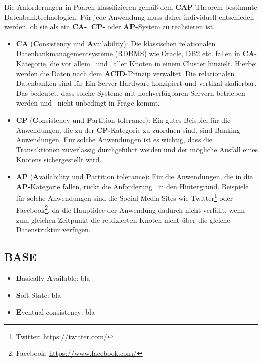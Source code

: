 Die Anforderungen in Paaren klassifizieren gemäß dem \textbf{CAP}-Theorem bestimmte Datenbanktechnologien. Für jede Anwendung muss daher individuell entschieden werden, ob sie als ein \textbf{CA-}, \textbf{CP-} oder \textbf{AP-}System zu realisieren ist.
\begin{itemize}
\item \textbf{CA} (\textbf{C}onsistency und \textbf{A}vailability): Die klassischen relationalen Datenbankmanagementsysteme (RDBMS) wie Oracle, DB2 etc. fallen in \textbf{CA}-Kategorie, die vor allem \Cap\ und \cAp\ aller Knoten in einem Cluster hinzielt. Hierbei werden die Daten nach dem \textbf{ACID}-Prinzip verwaltet. Die relationalen Datenbanken sind für Ein-Server-Hardware konzipiert und vertikal skalierbar. Das bedeutet, dass solche Systeme mit hochverfügbaren Servern betrieben werden und \caP\  nicht unbedingt in Frage kommt.

\item \textbf{CP} (\textbf{C}onsistency und \textbf{P}artition tolerance): Ein gutes Beispiel für die Anwendungen, die zu der \textbf{CP-}Kategorie zu zuordnen sind, sind Banking-Anwendungen. Für solche Anwendungen ist es wichtig, dass die Transaktionen zuverlässig durchgeführt werden und der mögliche Ausfall eines Knotens sichergestellt wird.

\item \textbf{AP} (\textbf{A}vailability und \textbf{P}artition tolerance): Für die Anwendungen, die in die \textbf{AP-}Kategorie fallen, rückt die Anforderung \Cap\ in den Hintergrund. Beispiele für solche Anwendungen sind die Social-Media-Sites wie Twitter\footnote{Twitter: \url{https://twitter.com/}} oder Facebook\footnote{Facebook: \url{https://www.facebook.com/}}, da die Hauptidee der Anwendung dadurch nicht verfällt, wenn zum gleichen Zeitpunkt die replizierten Knoten nicht über die gleiche Datenstruktur verfügen. 
\end{itemize}

\subsection{BASE}

\begin{itemize}
\item \textbf{B}asically \textbf{A}vailable: bla

\item \textbf{S}oft State: bla

\item \textbf{E}ventual consistency: bla
\end{itemize}

